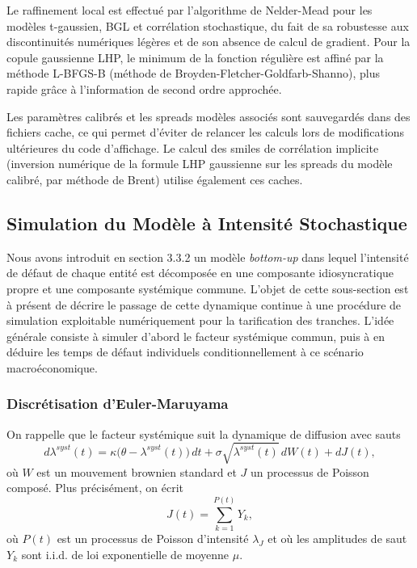 Le raffinement local est effectué par l'algorithme de Nelder-Mead pour les modèles t-gaussien,
BGL et corrélation stochastique, du fait de sa robustesse aux discontinuités numériques légères
et de son absence de calcul de gradient. Pour la copule gaussienne LHP, le minimum de la fonction
régulière est affiné par la méthode L-BFGS-B (méthode de Broyden-Fletcher-Goldfarb-Shanno), plus rapide grâce à l'information de second ordre
approchée.

Les paramètres calibrés et les spreads modèles associés sont sauvegardés dans des fichiers
cache, ce qui permet d'éviter de relancer les calculs lors de modifications ultérieures du code
d'affichage. Le calcul des smiles de corrélation implicite (inversion numérique de la formule
LHP gaussienne sur les spreads du modèle calibré, par méthode de Brent) utilise également
ces caches.

\subsection{Simulation du Modèle à Intensité Stochastique}

Nous avons introduit en section 3.3.2 un modèle \textit{bottom-up} dans lequel l'intensité de défaut de chaque entité est décomposée en une composante idiosyncratique propre et une composante systémique commune. L'objet de cette sous-section est à présent de décrire le passage de cette dynamique continue à une procédure de simulation exploitable numériquement pour la tarification des tranches. L'idée générale consiste à simuler d'abord le facteur systémique commun, puis à en déduire les temps de défaut individuels conditionnellement à ce scénario macroéconomique.

\subsubsection{Discrétisation d'Euler-Maruyama}

On rappelle que le facteur systémique suit la dynamique de diffusion avec sauts
$$
d\lambda^{syst}(t)=\kappa\bigl(\theta-\lambda^{syst}(t)\bigr)\,dt+\sigma\sqrt{\lambda^{syst}(t)}\,dW(t)+dJ(t),
$$
où $W$ est un mouvement brownien standard et $J$ un processus de Poisson composé. Plus précisément, on écrit
$$
J(t)=\sum_{k=1}^{P(t)} Y_k,
$$
où $P(t)$ est un processus de Poisson d'intensité $\lambda_J$ et où les amplitudes de saut $Y_k$ sont i.i.d. de loi exponentielle de moyenne $\mu$.

